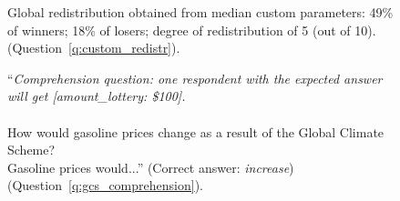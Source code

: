 \begin{figure}[h!]
    \caption[Median custom redistribution]{Global redistribution obtained from median custom parameters: 49\% of winners; 18\% of losers; degree of redistribution of 5 (out of 10). (Question~\ref{q:custom_redistr}).
    }\label{fig:custom_redistr_median}
\end{figure} %


\begin{figure}[h!]
    \caption[Comprehension question on GCS]{``\textit{Comprehension question: one respondent with the expected answer will get [amount\_lottery: \$100].}\\\\How would gasoline prices change as a result of the Global Climate Scheme? \\Gasoline prices would...'' (Correct answer: \textit{increase}) (Question~\ref{q:gcs_comprehension}).
    }\label{fig:gcs_comprehension}
\end{figure}

